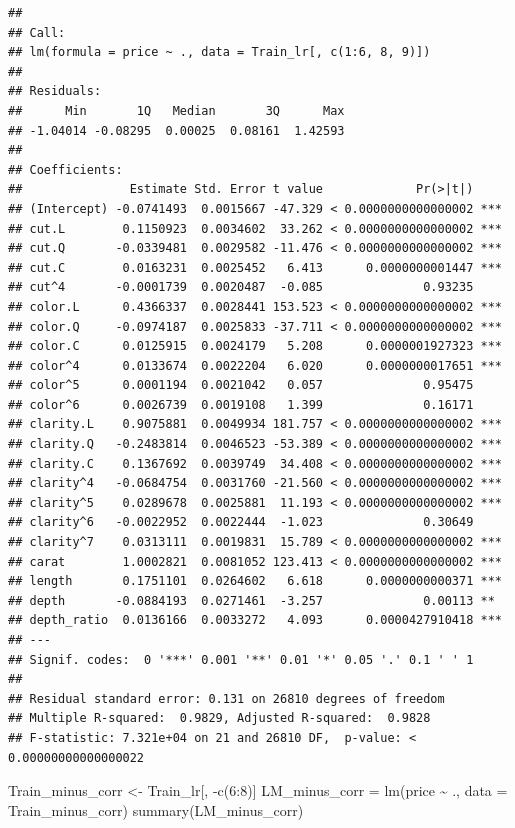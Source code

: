 \documentclass[
]{article}
\newenvironment{Shaded}{\begin{snugshade}}{\end{snugshade}}
\newcommand{\AttributeTok}[1]{\textcolor[rgb]{0.77,0.63,0.00}{#1}}
\newcommand{\DecValTok}[1]{\textcolor[rgb]{0.00,0.00,0.81}{#1}}
\newcommand{\FunctionTok}[1]{\textcolor[rgb]{0.00,0.00,0.00}{#1}}
\newcommand{\NormalTok}[1]{#1}
\newcommand{\OtherTok}[1]{\textcolor[rgb]{0.56,0.35,0.01}{#1}}
\newcommand{\SpecialCharTok}[1]{\textcolor[rgb]{0.00,0.00,0.00}{#1}}
\begin{document}
\begin{verbatim}
## 
## Call:
## lm(formula = price ~ ., data = Train_lr[, c(1:6, 8, 9)])
## 
## Residuals:
##      Min       1Q   Median       3Q      Max 
## -1.04014 -0.08295  0.00025  0.08161  1.42593 
## 
## Coefficients:
##               Estimate Std. Error t value             Pr(>|t|)    
## (Intercept) -0.0741493  0.0015667 -47.329 < 0.0000000000000002 ***
## cut.L        0.1150923  0.0034602  33.262 < 0.0000000000000002 ***
## cut.Q       -0.0339481  0.0029582 -11.476 < 0.0000000000000002 ***
## cut.C        0.0163231  0.0025452   6.413      0.0000000001447 ***
## cut^4       -0.0001739  0.0020487  -0.085              0.93235    
## color.L      0.4366337  0.0028441 153.523 < 0.0000000000000002 ***
## color.Q     -0.0974187  0.0025833 -37.711 < 0.0000000000000002 ***
## color.C      0.0125915  0.0024179   5.208      0.0000001927323 ***
## color^4      0.0133674  0.0022204   6.020      0.0000000017651 ***
## color^5      0.0001194  0.0021042   0.057              0.95475    
## color^6      0.0026739  0.0019108   1.399              0.16171    
## clarity.L    0.9075881  0.0049934 181.757 < 0.0000000000000002 ***
## clarity.Q   -0.2483814  0.0046523 -53.389 < 0.0000000000000002 ***
## clarity.C    0.1367692  0.0039749  34.408 < 0.0000000000000002 ***
## clarity^4   -0.0684754  0.0031760 -21.560 < 0.0000000000000002 ***
## clarity^5    0.0289678  0.0025881  11.193 < 0.0000000000000002 ***
## clarity^6   -0.0022952  0.0022444  -1.023              0.30649    
## clarity^7    0.0313111  0.0019831  15.789 < 0.0000000000000002 ***
## carat        1.0002821  0.0081052 123.413 < 0.0000000000000002 ***
## length       0.1751101  0.0264602   6.618      0.0000000000371 ***
## depth       -0.0884193  0.0271461  -3.257              0.00113 ** 
## depth_ratio  0.0136166  0.0033272   4.093      0.0000427910418 ***
## ---
## Signif. codes:  0 '***' 0.001 '**' 0.01 '*' 0.05 '.' 0.1 ' ' 1
## 
## Residual standard error: 0.131 on 26810 degrees of freedom
## Multiple R-squared:  0.9829, Adjusted R-squared:  0.9828 
## F-statistic: 7.321e+04 on 21 and 26810 DF,  p-value: < 0.00000000000000022
\end{verbatim}

\begin{Shaded}
\begin{Highlighting}[]
\NormalTok{Train\_minus\_corr }\OtherTok{\textless{}{-}}\NormalTok{ Train\_lr[, }\SpecialCharTok{{-}}\FunctionTok{c}\NormalTok{(}\DecValTok{6}\SpecialCharTok{:}\DecValTok{8}\NormalTok{)]}
\NormalTok{LM\_minus\_corr }\OtherTok{=} \FunctionTok{lm}\NormalTok{(price }\SpecialCharTok{\textasciitilde{}}\NormalTok{ ., }\AttributeTok{data =}\NormalTok{ Train\_minus\_corr)}
\FunctionTok{summary}\NormalTok{(LM\_minus\_corr)}
\end{Highlighting}
\end{Shaded}
\end{document}
